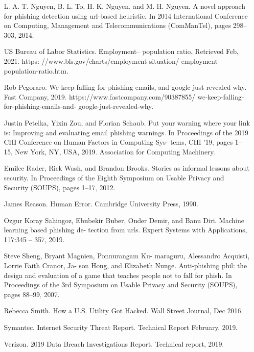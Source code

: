 \documentclass[lettersize,journal]{IEEEtran}
\begin{document}
\begin{thebibliography}{1}
  L. A. T. Nguyen, B. L. To, H. K. Nguyen, and M. H.
  Nguyen. A novel approach for phishing detection using
  url-based heuristic. In 2014 International Conference
  on Computing, Management and Telecommunications
  (ComManTel), pages 298–303, 2014.

  US Bureau of Labor Statistics. Employment–
  population ratio, Retrieved Feb, 2021. https:
  //www.bls.gov/charts/employment-situation/
  employment-population-ratio.htm.

  Rob Pegoraro. We keep falling for phishing emails,
  and google just revealed why. Fast Company,
  2019. https://www.fastcompany.com/90387855/
  we-keep-falling-for-phishing-emails-and-
  google-just-revealed-why.

  Justin Petelka, Yixin Zou, and Florian Schaub. Put your
  warning where your link is: Improving and evaluating
  email phishing warnings. In Proceedings of the 2019
  CHI Conference on Human Factors in Computing Sys-
  tems, CHI ’19, pages 1–15, New York, NY, USA, 2019.
  Association for Computing Machinery.

  Emilee Rader, Rick Wash, and Brandon Brooks. Stories
  as informal lessons about security. In Proceedings of
  the Eighth Symposium on Usable Privacy and Security
  (SOUPS), pages 1–17, 2012.

  James Reason. Human Error. Cambridge University
  Press, 1990.

  Ozgur Koray Sahingoz, Ebubekir Buber, Onder Demir,
  and Banu Diri. Machine learning based phishing de-
  tection from urls. Expert Systems with Applications,
  117:345 – 357, 2019.

  Steve Sheng, Bryant Magnien, Ponnurangam Ku-
  maraguru, Alessandro Acquisti, Lorrie Faith Cranor, Ja-
  son Hong, and Elizabeth Nunge. Anti-phishing phil: the
  design and evaluation of a game that teaches people not
  to fall for phish. In Proceedings of the 3rd Symposium
  on Usable Privacy and Security (SOUPS), pages 88–99,
  2007.

  Rebecca Smith. How a U.S. Utility Got Hacked. Wall Street Journal, Dec 2016.

  Symantec. Internet Security Threat Report. Technical Report February, 2019.

  Verizon. 2019 Data Breach Investigations Report. Technical report, 2019.


\end{thebibliography}
\end{document}
